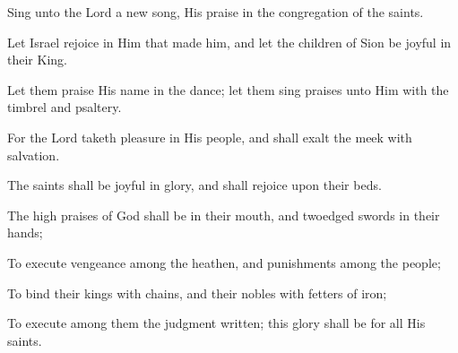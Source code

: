 Sing unto the Lord a new song, His praise in the congregation of the saints.

Let Israel rejoice in Him that made him, and let the children of Sion be joyful in their King.

Let them praise His name in the dance; let them sing praises unto Him with the timbrel and psaltery.

For the Lord taketh pleasure in His people, and shall exalt the meek with salvation.

The saints shall be joyful in glory, and shall rejoice upon their beds.

The high praises of God shall be in their mouth, and twoedged swords in their hands;

To execute vengeance among the heathen, and punishments among the people;

To bind their kings with chains, and their nobles with fetters of iron;

To execute among them the judgment written; this glory shall be for all His saints.
